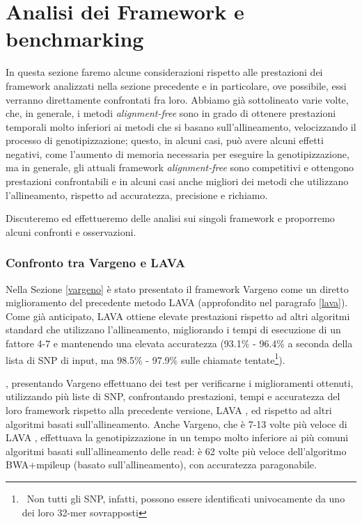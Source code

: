 \documentclass[../main.tex]{subfiles}
\begin{document}
\section{Analisi dei Framework e benchmarking}

In questa sezione faremo alcune considerazioni rispetto alle prestazioni dei framework analizzati nella sezione precedente e in particolare, ove possibile, essi verranno direttamente confrontati fra loro. Abbiamo già sottolineato varie volte, che, in generale, i metodi \textit{alignment-free} sono in grado di ottenere prestazioni temporali molto inferiori ai metodi che si basano sull'allineamento, velocizzando il processo di genotipizzazione; questo, in alcuni casi, può avere alcuni effetti negativi, come l'aumento di memoria necessaria per eseguire la genotipizzazione, ma in generale, gli attuali framework \textit{alignment-free} sono competitivi e ottengono prestazioni confrontabili e in alcuni casi anche migliori dei metodi che utilizzano l'allineamento, rispetto ad accuratezza, precisione e richiamo. 

Discuteremo ed effettueremo delle analisi sui singoli framework e proporremo alcuni confronti e osservazioni.


\subsubsection{Confronto tra Vargeno e LAVA}

Nella Sezione \ref{vargeno} è stato presentato il framework Vargeno come un diretto miglioramento del precedente metodo LAVA (approfondito nel paragrafo \ref{lava}). Come già anticipato, LAVA ottiene elevate prestazioni rispetto ad altri algoritmi standard che utilizzano l'allineamento, migliorando i tempi di esecuzione di un fattore 4-7 e mantenendo una elevata accuratezza (93.1\% - 96.4\% a seconda della lista di SNP di input, ma 98.5\% - 97.9\% sulle chiamate tentate\footnote{\ Non tutti gli SNP, infatti, possono essere identificati univocamente da uno dei loro 32-mer sovrapposti}).

\cite{sun-medvedev2018vargeno}, presentando Vargeno effettuano dei test per verificarne i miglioramenti ottenuti, utilizzando più liste di SNP, confrontando prestazioni, tempi e accuratezza del loro framework rispetto alla precedente versione, LAVA , ed rispetto ad altri algoritmi basati sull'allineamento. Anche Vargeno, che è 7-13 volte più veloce di LAVA , effettuava la genotipizzazione in un tempo molto inferiore ai più comuni algoritmi basati sull'allineamento delle read: è 62 volte più veloce dell'algoritmo BWA+mpileup (basato sull'allineamento), con accuratezza paragonabile. 
\end{document}
